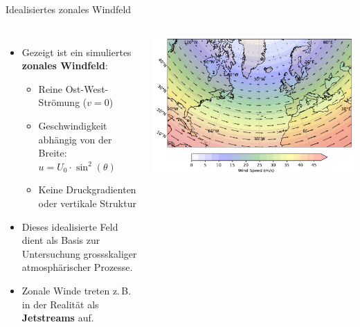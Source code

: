 

\begin{frame}{Idealisiertes zonales Windfeld}
	\begin{columns}
		\begin{itemize}
			\item Gezeigt ist ein simuliertes \textbf{zonales Windfeld}:
			      \begin{itemize}
				      \item Reine Ost-West-Strömung (\(v = 0\))
				      \item Geschwindigkeit abhängig von der Breite: \(u = U_0 \cdot \sin^2(\theta)\)
				      \item Keine Druckgradienten oder vertikale Struktur
			      \end{itemize}
			\item Dieses idealisierte Feld dient als Basis zur Untersuchung grossskaliger atmosphärischer Prozesse.
			\item Zonale Winde treten z.\,B. in der Realität als \textbf{Jetstreams} auf.
		\end{itemize}

		\centering
		\includegraphics[width=\linewidth]{../images/zonal_wind_plot.pdf}
	\end{columns}
\end{frame}



